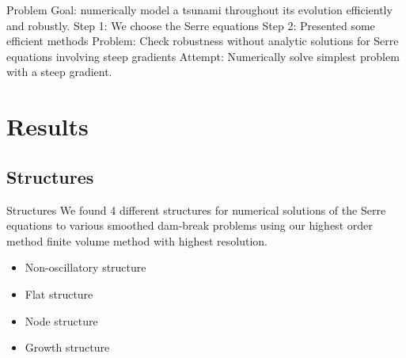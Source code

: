 \documentclass[pdf]{beamer}
\begin{document}
\begin{frame}{Problem}	
	Goal: numerically model a tsunami throughout its evolution efficiently and robustly.
	\vskip 0.2cm	
	Step 1: We choose the Serre equations 
	\vskip 0.2cm
	Step 2: Presented some efficient methods
	\vskip 0.2cm
	Problem: Check robustness without analytic solutions for Serre equations involving steep gradients
	\vskip 0.2cm
	Attempt: Numerically solve simplest problem with a steep gradient.
	
\end{frame}

\section{Results}
\subsection{Structures}

\begin{frame}{Structures}
	We found 4 different structures for numerical solutions of the Serre equations to various smoothed dam-break problems using our highest order method finite volume method with highest resolution.
	\begin{itemize}
		\item Non-oscillatory structure
		\item Flat structure
		\item Node structure
		\item Growth structure
	\end{itemize}
\end{frame}

\end{document}
